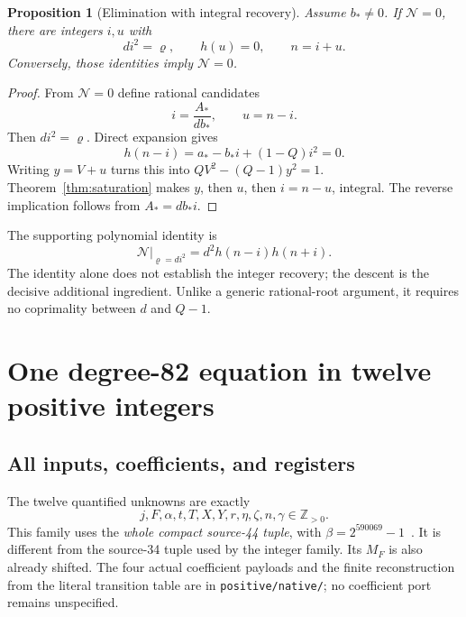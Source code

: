 \documentclass[11pt]{article}
\newtheorem{proposition}[theorem]{Proposition}
\theoremstyle{remark}\newtheorem{remark}[theorem]{Remark}
\newcommand{\Z}{\mathbb Z}\newcommand{\Q}{\mathbb Q}\newcommand{\N}{\mathbb N}\newcommand{\Pos}{\operatorname{Pos}}\newcommand{\Cone}{\mathcal C}\newcommand{\Con}{\operatorname{Con}}
\begin{document}
\begin{proposition}[Elimination with integral recovery]\label{prop:merger}
Assume $b_*\ne0$. If $\mathcal N=0$, there are integers $i,u$ with
\[
 di^2=\varrho,\qquad h(u)=0,\qquad n=i+u.
\]
Conversely, those identities imply $\mathcal N=0$.
\end{proposition}
\begin{proof}
From $\mathcal N=0$ define rational candidates
\[
 i=\frac{A_*}{d b_*},\qquad u=n-i.
\]
Then $di^2=\varrho$. Direct expansion gives
\[
 h(n-i)=a_*-b_*i+(1-Q)i^2=0.
\]
Writing $y=V+u$ turns this into $QV^2-(Q-1)y^2=1$. Theorem~\ref{thm:saturation} makes $y$, then $u$, then $i=n-u$, integral. The reverse implication follows from $A_*=d b_*i$.
\end{proof}

The supporting polynomial identity is
\[
 \left.\mathcal N\right|_{\varrho=di^2}
 =d^2h(n-i)h(n+i).
\]
The identity alone does not establish the integer recovery; the descent is the decisive additional ingredient. Unlike a generic rational-root argument, it requires no coprimality between $d$ and $Q-1$.

\section{One degree-82 equation in twelve positive integers}\label{sec:positive}

\subsection{All inputs, coefficients, and registers}

The twelve quantified unknowns are exactly
\[
 j,F,\alpha,t,T,X,Y,r,\eta,\zeta,n,\gamma\in\Z_{>0}.
\]
This family uses the \emph{whole compact source-44 tuple}, with $\beta=2^{590069}-1$~\cite{source44}. It is different from the source-34 tuple used by the integer family. Its $M_F$ is also already shifted. The four actual coefficient payloads and the finite reconstruction from the literal transition table are in \texttt{positive/native/}; no coefficient port remains unspecified.
\end{document}
